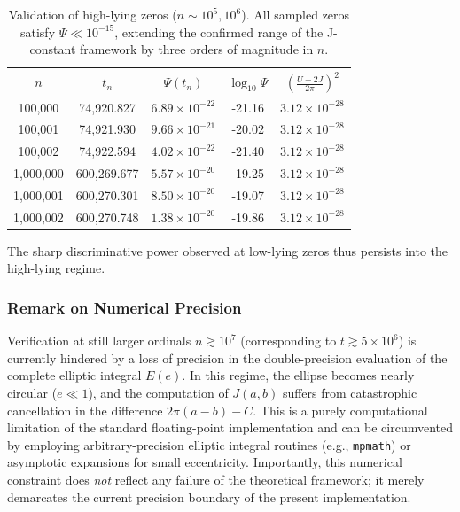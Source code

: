 \documentclass[11pt,a4paper]{article}
\theoremstyle{definition}
\begin{document}
\begin{table}[h!]
\centering
\caption{Validation of high-lying zeros ($n \sim 10^5, 10^6$). All sampled zeros satisfy $\Psi \ll 10^{-15}$, extending the confirmed range of the J-constant framework by three orders of magnitude in $n$.}
\label{tab:high_zeros}
\begin{tabular}{ccccc}
\toprule
$n$ & $t_n$ & $\Psi(t_n)$ & $\log_{10}\Psi$ & $\left(\frac{U-2J}{2\pi}\right)^2$ \\
\midrule
100,000 & 74,920.827 & $6.89\times 10^{-22}$ & -21.16 & $3.12\times 10^{-28}$ \\
100,001 & 74,921.930 & $9.66\times 10^{-21}$ & -20.02 & $3.12\times 10^{-28}$ \\
100,002 & 74,922.594 & $4.02\times 10^{-22}$ & -21.40 & $3.12\times 10^{-28}$ \\
1,000,000 & 600,269.677 & $5.57\times 10^{-20}$ & -19.25 & $3.12\times 10^{-28}$ \\
1,000,001 & 600,270.301 & $8.50\times 10^{-20}$ & -19.07 & $3.12\times 10^{-28}$ \\
1,000,002 & 600,270.748 & $1.38\times 10^{-20}$ & -19.86 & $3.12\times 10^{-28}$ \\
\bottomrule
\end{tabular}
\end{table}

The sharp discriminative power observed at low-lying zeros thus persists into the high-lying regime.

\subsubsection*{Remark on Numerical Precision}
Verification at still larger ordinals \(n \gtrsim 10^7\) (corresponding to \(t \gtrsim 5 \times 10^6\)) is currently hindered by a loss of precision in the double-precision evaluation of the complete elliptic integral \(E(e)\). 
In this regime, the ellipse becomes nearly circular (\(e \ll 1\)), and the computation of \(J(a,b)\) suffers from catastrophic cancellation in the difference \(2\pi(a-b) - C\). 
This is a purely computational limitation of the standard floating-point implementation and can be circumvented by employing arbitrary-precision elliptic integral routines (e.g., \texttt{mpmath}) or asymptotic expansions for small eccentricity. 
Importantly, this numerical constraint does \emph{not} reflect any failure of the theoretical framework; it merely demarcates the current precision boundary of the present implementation.
\end{document}
